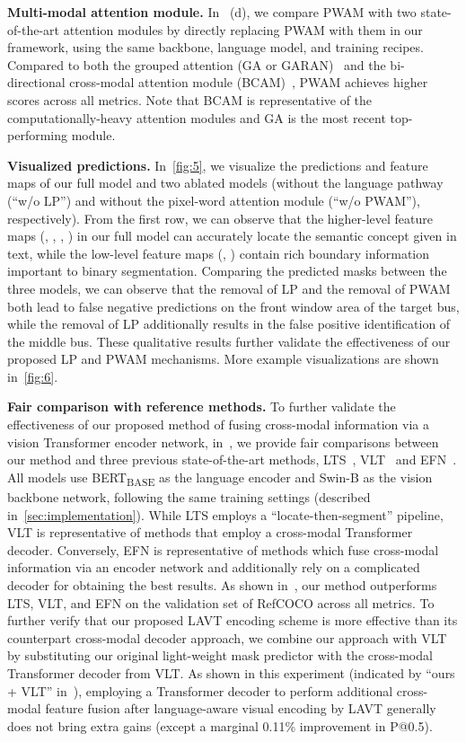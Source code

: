 \documentclass[10pt,twocolumn,letterpaper]{article}
\begin{document}
\noindent \textbf{Multi-modal attention module.}
In~ (d), we compare PWAM with two state-of-the-art attention modules by directly replacing PWAM with them in our framework, using the same backbone, language model, and training recipes.
Compared to both the grouped attention (GA or GARAN)~\cite{luo2020cascade,Luo_2020_mcn} and the bi-directional cross-modal attention module (BCAM)~\cite{hu2020brinet}, PWAM achieves higher scores across all metrics.
Note that BCAM is representative of the computationally-heavy attention modules and GA is the most recent top-performing module.

\noindent \textbf{Visualized predictions.}
In~\cref{fig:5}, we visualize the predictions and feature maps of our full model and two ablated models (without the language pathway (``w/o LP'') and without the pixel-word attention module (``w/o PWAM''), respectively).
From the first row, we can observe that the higher-level feature maps (\ie, , , ) in our full model can accurately locate the semantic concept given in text, while the low-level feature maps (\ie, ) contain rich boundary information important to binary segmentation.
Comparing the predicted masks between the three models, we can observe that the removal of LP and the removal of PWAM both lead to false negative predictions on the front window area of the target bus, while the removal of LP additionally results in the false positive identification of the middle bus.
These qualitative results further validate the effectiveness of our proposed LP and PWAM mechanisms.
More example visualizations are shown in~\cref{fig:6}.

\noindent \textbf{Fair comparison with reference methods.}
To further validate the effectiveness of our proposed method of fusing cross-modal information via a vision Transformer encoder network, in~, we provide fair comparisons between our method and three previous state-of-the-art methods, LTS~\cite{Jing_2021_Locate}, VLT~\cite{Ding_2021_vlt} and EFN~\cite{EFN}.
All models use BERT\textsubscript{BASE} as the language encoder and Swin-B as the vision backbone network, following the same training settings (described in~\cref{sec:implementation}).
While LTS employs a ``locate-then-segment'' pipeline, VLT is representative of methods that employ a cross-modal Transformer decoder.
Conversely, EFN is representative of methods which fuse cross-modal information via an encoder network and additionally rely on a complicated decoder for obtaining the best results.
As shown in~, our method outperforms LTS, VLT, and EFN on the validation set of RefCOCO across all metrics.
To further verify that our proposed LAVT encoding scheme is more effective than its counterpart cross-modal decoder approach, we combine our approach with VLT by substituting our original light-weight mask predictor with the cross-modal Transformer decoder from VLT.
As shown in this experiment (indicated by ``ours + VLT'' in~), employing a Transformer decoder to perform additional cross-modal feature fusion after language-aware visual encoding by LAVT generally does not bring extra gains (except a marginal 0.11\% improvement in P@0.5).
\end{document}
